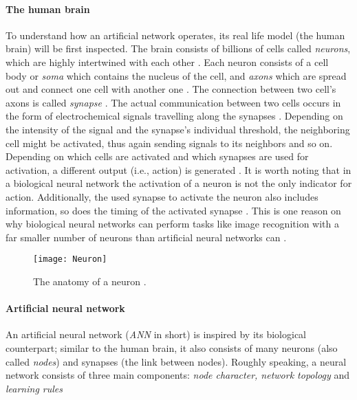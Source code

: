 \documentclass[draft,final]{vutinfth} %
\begin{document}
\paragraph{The human brain} To understand how an artificial network operates, its real life model (the human brain) will be first inspected. The brain consists of billions of cells called \emph{neurons}, which are highly intertwined with each other \cite{shanmuganathan2016artificial}. Each neuron consists of a cell body or \emph{soma} which contains the nucleus of the cell, and \emph{axons} which are spread out and connect one cell with another one \cite{ariyo2024anatomy}. The connection between two cell's axons is called \emph{synapse} \cite{zou2009overview}. The actual communication between two cells occurs in the form of electrochemical signals travelling along the synapses \cite{ariyo2024anatomy}. Depending on the intensity of the signal and the synapse's individual threshold, the neighboring cell might be activated, thus again sending signals to its neighbors and so on. Depending on which cells are activated and which synapses are used for activation, a different output (i.e., action) is generated \cite{zou2009overview}.  
It is worth noting that in a biological neural network the activation of a neuron is not the only indicator for action. Additionally, the used synapse to activate the neuron also includes information, so does the timing of the activated synapse \cite{ariyo2024anatomy}. This is one reason on why biological neural networks can perform tasks like image recognition with a far smaller number of neurons than artificial neural networks can \cite{zou2009overview}.  

\begin{figure}
\begin{center}
\texttt{[image: Neuron]}
\end{center}
\caption{The anatomy of a neuron \cite{zou2009overview}.}
\end{figure}

\paragraph{Artificial neural network} An artificial neural network (\emph{ANN} in short) is inspired by its biological counterpart; similar to the human brain, it also consists of many neurons (also called \emph{nodes}) and synapses (the link between nodes). Roughly speaking, a neural network consists of three main components: \emph{node character, network topology} and \emph{learning rules} \cite{zou2009overview}
\end{document}
